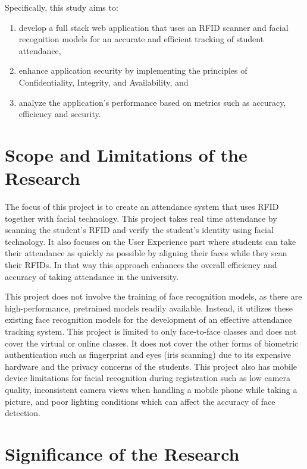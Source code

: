 Specifically, this study aims to:

\begin{enumerate}

   \item develop a full stack web application that uses an RFID scanner and facial recognition models for an accurate and efficient tracking of student attendance,
   \item enhance application security by implementing the principles of Confidentiality, Integrity, and Availability, and
   \item analyze the application's performance based on metrics such as accuracy, efficiency and security.
\end{enumerate}

\section{Scope and Limitations of the Research}
\label{sec:scopelimitations}

The focus of this project is to create an attendance system that uses RFID together with facial technology. This project takes real time attendance by scanning the student's RFID and verify the student's identity using facial technology. It also focuses on the User Experience part where students can take their attendance as quickly as possible by aligning their faces while they scan their RFIDs. In that way this approach enhances the overall efficiency and accuracy of taking attendance in the university.

This project does not involve the training of face recognition models, as there are high-performance, pretrained models readily available. Instead, it utilizes these existing face recognition models for the development of an effective attendance tracking system. This project is limited to only face-to-face classes and does not cover the virtual or online classes. It does not cover the other forms of biometric authentication such as fingerprint and eyes (iris scanning) due to its expensive hardware and the privacy concerns of the students. This project also has mobile device limitations for facial recognition during registration such as low camera quality, inconsistent camera views when handling a mobile phone while taking a picture, and poor lighting conditions which can affect the accuracy of face detection.

\section{Significance of the Research}
\label{sec:significance}


